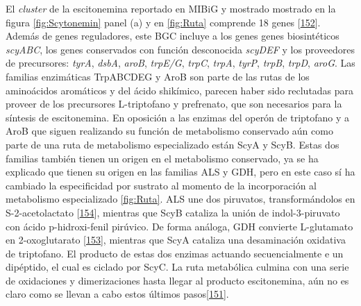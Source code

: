 \documentclass[12pt,twoside]{reedthesis}
\begin{document}
  El \emph{cluster} de la escitonemina reportado en MIBiG y mostrado
  mostrado en la figura \autoref{fig:Scytonemin} panel (a) y en
  \autoref{fig:Ruta} comprende 18 genes
  {[}\protect\hyperlink{ref-soule_comparative_2009}{152}{]}. Además de
  genes reguladores, este BGC incluye a los genes genes biosintéticos
  \emph{scyABC}, los genes conservados con función desconocida
  \emph{scyDEF} y los proveedores de precursores: \emph{tyrA},
  \emph{dsbA}, \emph{aroB}, \emph{trpE/G}, \emph{trpC}, \emph{trpA},
  \emph{tyrP}, \emph{trpB}, \emph{trpD}, \emph{aroG}. Las familias
  enzimáticas TrpABCDEG y AroB son parte de las rutas de los aminoácidos
  aromáticos y del ácido shikímico, parecen haber sido reclutadas para
  proveer de los precursores L-triptofano y prefrenato, que son necesarios
  para la síntesis de escitonemina. En oposición a las enzimas del operón
  de triptofano y a AroB que siguen realizando su función de metabolismo
  conservado aún como parte de una ruta de metabolismo especializado están
  ScyA y ScyB. Estas dos familias también tienen un origen en el
  metabolismo conservado, ya se ha explicado que tienen su origen en las
  familias ALS y GDH, pero en este caso sí ha cambiado la especificidad
  por sustrato al momento de la incorporación al metabolismo especializado
  \autoref{fig:Ruta}. ALS une dos piruvatos, transformándolos en
  S-2-acetolactato
  {[}\protect\hyperlink{ref-liu_acetohydroxyacid_2016}{154}{]}, mientras
  que ScyB cataliza la unión de indol-3-piruvato con ácido p-hidroxi-fenil
  pirúvico. De forma análoga, GDH convierte L-glutamato en 2-oxoglutarato
  {[}\protect\hyperlink{ref-engel_glutamate_2014}{153}{]}, mientras que
  ScyA cataliza una desaminación oxidativa de triptofano. El producto de
  estas dos enzimas actuando secuencialmente e un dipéptido, el cual es
  ciclado por ScyC. La ruta metabólica culmina con una serie de
  oxidaciones y dimerizaciones hasta llegar al producto escitonemina, aún
  no es claro como se llevan a cabo estos últimos
  pasos{[}\protect\hyperlink{ref-balskus_investigating_2008}{151}{]}.
  
\end{document}
